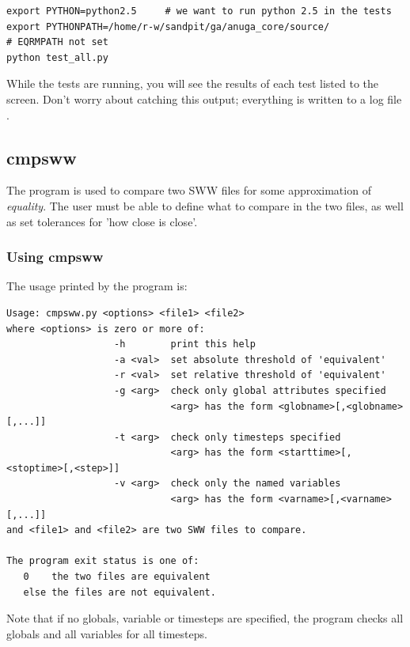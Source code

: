 \documentclass{manual}
\begin{document}
\begin{verbatim}
export PYTHON=python2.5		# we want to run python 2.5 in the tests
export PYTHONPATH=/home/r-w/sandpit/ga/anuga_core/source/
# EQRMPATH not set
python test_all.py
\end{verbatim}

While the tests are running, you will see the results of each test listed to the 
screen.  Don't worry about catching this output; everything is written to a log file
.

\pagebreak

\subsection{cmpsww}
\label{subsec:cmpsww}

The  program is used to compare two SWW files for some approximation
of \emph{equality}.  The user must be able to define what to compare in the two files,
as well as set tolerances for 'how close is close'.

\subsubsection{Using cmpsww}
\label{subsubsec:cmpsww_use}

The usage printed by the program is:

\begin{verbatim}
Usage: cmpsww.py <options> <file1> <file2>
where <options> is zero or more of:
                   -h        print this help
                   -a <val>  set absolute threshold of 'equivalent'
                   -r <val>  set relative threshold of 'equivalent'
                   -g <arg>  check only global attributes specified
                             <arg> has the form <globname>[,<globname>[,...]]
                   -t <arg>  check only timesteps specified
                             <arg> has the form <starttime>[,<stoptime>[,<step>]]
                   -v <arg>  check only the named variables
                             <arg> has the form <varname>[,<varname>[,...]]
and <file1> and <file2> are two SWW files to compare.

The program exit status is one of:
   0    the two files are equivalent
   else the files are not equivalent.
\end{verbatim}

Note that if no globals, variable or timesteps are specified, the program checks
all globals and all variables for all timesteps.
\end{document}

